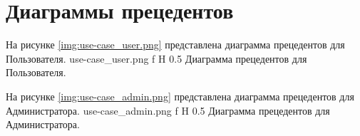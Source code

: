 \section{Диаграммы прецедентов}
На рисунке \ref{img:use-case_user.png} представлена диаграмма прецедентов для Пользователя.
{use-case_user.png}
{f}
{H}
{0.5\textheight}
{Диаграмма прецедентов для Пользователя.}


На рисунке \ref{img:use-case_admin.png} представлена диаграмма прецедентов для Администратора.
{use-case_admin.png}
{f}
{H}
{0.5\textheight}
{Диаграмма прецедентов для Администратора.}